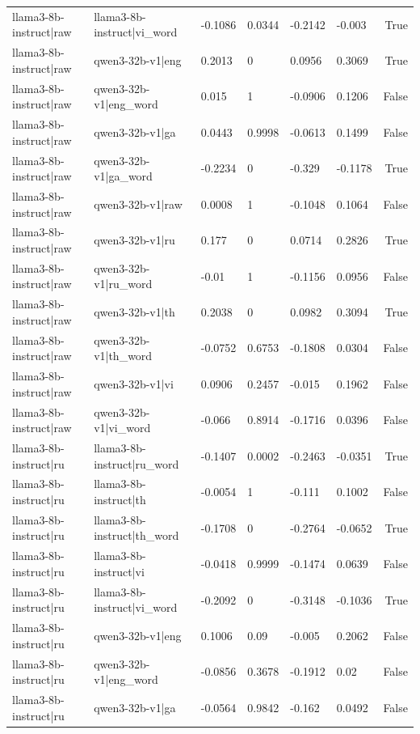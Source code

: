\begin{table}
\begin{tabular}{llllllr}
llama3-8b-instruct|raw & llama3-8b-instruct|vi_word & -0.1086 & 0.0344 & -0.2142 & -0.003 & True \\
llama3-8b-instruct|raw & qwen3-32b-v1|eng & 0.2013 & 0 & 0.0956 & 0.3069 & True \\
llama3-8b-instruct|raw & qwen3-32b-v1|eng_word & 0.015 & 1 & -0.0906 & 0.1206 & False \\
llama3-8b-instruct|raw & qwen3-32b-v1|ga & 0.0443 & 0.9998 & -0.0613 & 0.1499 & False \\
llama3-8b-instruct|raw & qwen3-32b-v1|ga_word & -0.2234 & 0 & -0.329 & -0.1178 & True \\
llama3-8b-instruct|raw & qwen3-32b-v1|raw & 0.0008 & 1 & -0.1048 & 0.1064 & False \\
llama3-8b-instruct|raw & qwen3-32b-v1|ru & 0.177 & 0 & 0.0714 & 0.2826 & True \\
llama3-8b-instruct|raw & qwen3-32b-v1|ru_word & -0.01 & 1 & -0.1156 & 0.0956 & False \\
llama3-8b-instruct|raw & qwen3-32b-v1|th & 0.2038 & 0 & 0.0982 & 0.3094 & True \\
llama3-8b-instruct|raw & qwen3-32b-v1|th_word & -0.0752 & 0.6753 & -0.1808 & 0.0304 & False \\
llama3-8b-instruct|raw & qwen3-32b-v1|vi & 0.0906 & 0.2457 & -0.015 & 0.1962 & False \\
llama3-8b-instruct|raw & qwen3-32b-v1|vi_word & -0.066 & 0.8914 & -0.1716 & 0.0396 & False \\
llama3-8b-instruct|ru & llama3-8b-instruct|ru_word & -0.1407 & 0.0002 & -0.2463 & -0.0351 & True \\
llama3-8b-instruct|ru & llama3-8b-instruct|th & -0.0054 & 1 & -0.111 & 0.1002 & False \\
llama3-8b-instruct|ru & llama3-8b-instruct|th_word & -0.1708 & 0 & -0.2764 & -0.0652 & True \\
llama3-8b-instruct|ru & llama3-8b-instruct|vi & -0.0418 & 0.9999 & -0.1474 & 0.0639 & False \\
llama3-8b-instruct|ru & llama3-8b-instruct|vi_word & -0.2092 & 0 & -0.3148 & -0.1036 & True \\
llama3-8b-instruct|ru & qwen3-32b-v1|eng & 0.1006 & 0.09 & -0.005 & 0.2062 & False \\
llama3-8b-instruct|ru & qwen3-32b-v1|eng_word & -0.0856 & 0.3678 & -0.1912 & 0.02 & False \\
llama3-8b-instruct|ru & qwen3-32b-v1|ga & -0.0564 & 0.9842 & -0.162 & 0.0492 & False \\

\end{tabular}
\end{table}
